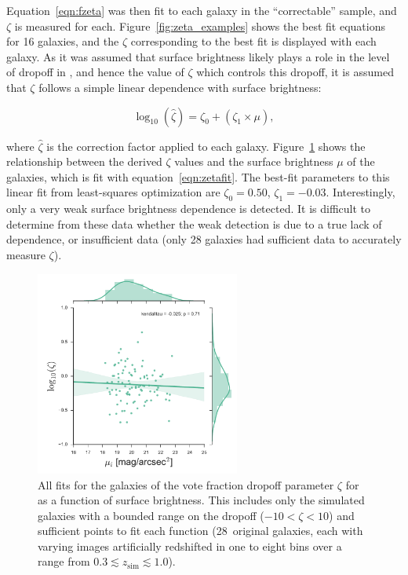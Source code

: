 Equation~\ref{eqn:fzeta} was then fit to each galaxy in the ``correctable'' \ferengi{} sample, and $\zeta$ is measured for each. Figure~\ref{fig:zeta_examples} shows the best fit equations for 16 galaxies, and the $\zeta$ corresponding to the best fit is displayed with each galaxy. As it was assumed that surface brightness likely plays a role in the level of dropoff in \ffeatures{}, and hence the value of $\zeta$ which controls this dropoff, it is assumed that $\zeta$ follows a simple linear dependence with surface brightness:


\begin{equation}
\log_{10}(\hat\zeta) = \zeta_0 + (\zeta_1 \times \mu),
\label{eqn:zetafit}
\end{equation}

where $\hat\zeta$ is the correction factor applied to each galaxy. Figure~\ref{fig:zeta_mu} shows the relationship between the derived $\zeta$ values and the surface brightness $\mu$ of the \ferengi{} galaxies, which is fit with equation~\ref{eqn:zetafit}. The best-fit parameters to this linear fit from least-squares optimization are  $\zeta_0=0.50$, $\zeta_1=-0.03$. Interestingly, only a very weak surface brightness dependence is detected. It is difficult to determine from these data whether the weak detection is due to a true lack of dependence, or insufficient data (only 28 galaxies had sufficient data to accurately measure $\zeta$). 

\begin{figure}
\center
\includegraphics[width=0.6\textwidth]{figures/zeta_mu.pdf}
\caption{All fits for the \ferengi{} galaxies of the vote fraction dropoff
parameter $\zeta$ for \ffeatures{} as a function of surface brightness. This
includes only the simulated galaxies with a bounded range on the dropoff
($-10<\zeta<10$) and sufficient points to fit each function (28~original
galaxies, each with varying images artificially redshifted in one to eight bins over a range from $0.3\lesssim z_\mathrm{sim}\lesssim1.0$).}

\label{fig:zeta_mu}
\end{figure}


